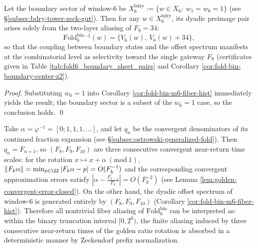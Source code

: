 \begin{corollary}\label{cor:terminal-foldbin6-boundary-pure-f9-alias}
Let the boundary sector of window-\(6\) be
\(
X^{\mathrm{bdry}}_6:=\{w\in X_6:\ w_1=w_6=1\}
\)
(see \S\ref{subsec:bdry-tower-zeck-gut}).
Then for any \(w\in X^{\mathrm{bdry}}_6\), its dyadic preimage pair arises solely from the two-layer aliasing of \(F_9=34\):
\[
\mathrm{Fold}^{\mathrm{bin}}_6{}^{-1}(w)=\{V_6(w),\ V_6(w)+34\},
\]
so that the coupling between boundary states and the offset spectrum manifests at the combinatorial level as selectivity toward the single gateway \(F_9\) (certificates given in Table \ref{tab:fold6_boundary_sheet_pairs} and Corollary \ref{cor:fold-bin-boundary-center-z2}).
\end{corollary}
\begin{proof}
Substituting \(w_6=1\) into Corollary \ref{cor:fold-bin-m6-fiber-hist} immediately yields the result; the boundary sector is a subset of the \(w_6=1\) case, so the conclusion holds. \qed
\end{proof}

\begin{corollary}\label{cor:terminal-foldbin6-offsets-return-times}
Take \(\alpha=\varphi^{-1}=[0;1,1,1,\dots]\), and let \(q_n\) be the convergent denominators of its continued fraction expansion (see \S\ref{subsec:ostrowski-generalized-fold}).
Then \(q_n=F_{n+1}\), so \((F_8,F_9,F_{10})\) are three consecutive convergent near-return time scales: for the rotation \(x\mapsto x+\alpha\ (\mathrm{mod}\ 1)\),
\(
\|F_k\alpha\|=\min_{p\in\ZZ}|F_k\alpha-p|
=O(F_k^{-1})
\)
and the corresponding convergent approximation errors satisfy \(\left|\alpha-\frac{F_{k-1}}{F_k}\right|=O(F_k^{-2})\) (see Lemma \ref{lem:golden-convergent-error-closed}).
On the other hand, the dyadic offset spectrum of window-\(6\) is generated entirely by \((F_8,F_9,F_{10})\) (Corollary \ref{cor:fold-bin-m6-fiber-hist}).
Therefore all nontrivial fiber aliasing of \(\mathrm{Fold}^{\mathrm{bin}}_6\) can be interpreted as: within the binary truncation interval \([0,2^6)\), the finite aliasing induced by three consecutive near-return times of the golden ratio rotation is absorbed in a deterministic manner by Zeckendorf prefix normalization.
\end{corollary}

